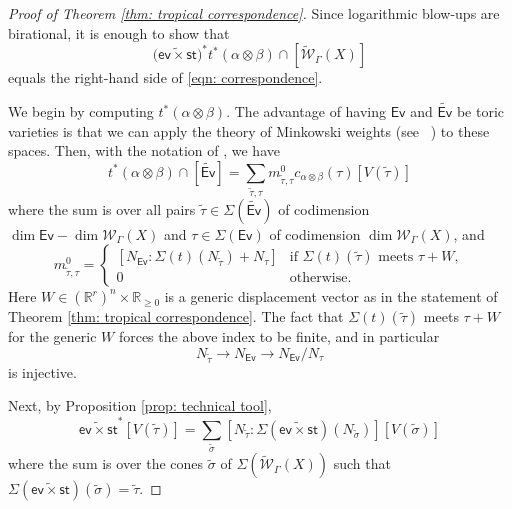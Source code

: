 \documentclass{article}
\def\Ev{{\mathsf{Ev}}}
\def\R{\mathbb{R}}
\def\WG{\mathcal{W}_{\Gamma}}
\begin{document}
\begin{proof}[Proof of  Theorem \ref{thm: tropical correspondence}]


    Since logarithmic blow-ups are birational, it is enough to show that 
\[
\big(\widetilde{\mathsf{ev} \times \mathsf{st}}\big)^* t^*(\alpha \otimes \beta) \cap 
[\widetilde{\mathcal{W}}_{\Gamma}(X)]
\]
equals the right-hand side of \eqref{eqn: correspondence}.

We begin by computing $t^*(\alpha \otimes \beta)$. The advantage of having $\Ev$ 
and $\widetilde{\Ev}$ be toric varieties is that we can apply the theory of 
Minkowski weights (see ~\cite{FuSt}) to these spaces.  Then, with the notation of \cite[Corollary 3.6]{FuSt}, we have
$$
t^*(\alpha \otimes \beta) \cap [\widetilde{\Ev}]= \sum_{\widetilde{\tau}, \tau} m_{\widetilde{\tau},\tau}^0 c_{\alpha \otimes \beta}(\tau)[V(\widetilde{\tau})]
$$
where the sum is over all pairs $\widetilde{\tau} \in \Sigma(\widetilde{\Ev})$ of codimension $\dim \Ev - \dim \WG(X)$ and $ \tau \in \Sigma(\Ev) $ of codimension $\dim  \WG(X)$, and
\[
m_{\widetilde{\tau},\tau}^0=
\begin{cases}
\left[  N_{\Ev}: \Sigma(t)( N_{\widetilde{\tau}})+ N_\tau \right] 
& \text{if } \Sigma(t)(\widetilde{\tau}) \text{ meets } \tau +W, \\[6pt]
0 & \text{otherwise}.
\end{cases}
\]
Here $W \in (\R^r)^n \times \R_{\geq 0}$ is a generic displacement vector as in the statement of Theorem \ref{thm: tropical correspondence}. The fact that $\Sigma(t)(\widetilde{\tau})$ meets $\tau+W$ for the generic $W$ forces the above index to be finite, and in particular
\begin{equation}\label{eqn: injective map of lattices}
N_{\widetilde{\tau}} \to N_{\Ev} \to N_{\Ev}/N_\tau
\end{equation}
is injective. 

Next, by Proposition \ref{prop: technical tool}, 
\begin{equation}\label{eqn: correspondence-after-subdivision}
\widetilde{\mathsf{ev} \times \mathsf{st}}^*[V(\widetilde{\tau})]= \sum_{\widetilde{\sigma}} [  N_{\widetilde{\tau}}: \Sigma(\widetilde{\mathsf{ev} \times \mathsf{st}})( N_{\widetilde{\sigma}})] [V(\widetilde\sigma)]
\end{equation}
where the sum is over the cones $\widetilde{\sigma}$ of $\Sigma( \widetilde{\mathcal{W}}_{\Gamma}(X))$ such that $\Sigma(\widetilde{\mathsf{ev} \times \mathsf{st}})(\widetilde{\sigma})= \widetilde{\tau} $.


\end{proof}
\end{document}
